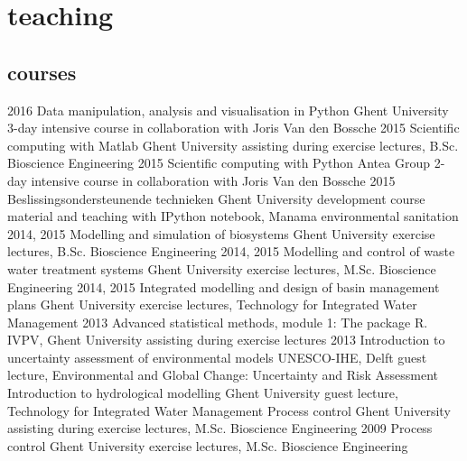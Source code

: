 \documentclass[]{stvhoey-cv}  %
\begin{document}
\section{teaching}
\subsection*{courses}
\begin{entrylist}
  \entry
    {2016}
    {Data manipulation, analysis and visualisation in Python}
    {Ghent University}
    {3-day intensive course in collaboration with Joris Van den Bossche}
  \entry
    {2015}
    {Scientific computing with Matlab}
    {Ghent University}
    {assisting during exercise lectures, B.Sc. Bioscience Engineering}
  \entry
    {2015}
    {Scientific computing with Python}
    {Antea Group}
    {2-day intensive course in collaboration with Joris Van den Bossche}
  \entry
    {2015}
    {Beslissingsondersteunende technieken}
    {Ghent University}
    {development course material and teaching with IPython notebook, Manama environmental sanitation}
  \entry
    {2014, 2015}
    {Modelling and simulation of biosystems}
    {Ghent University}
    {exercise lectures, B.Sc. Bioscience Engineering}
   \entry
    {2014, 2015} %
    {Modelling and control of waste water treatment systems}
    {Ghent University}
    {exercise lectures, M.Sc. Bioscience Engineering}
   \entry
    {2014, 2015}%
    {Integrated modelling and design of basin management plans}
    {Ghent University}
    {exercise lectures, Technology for Integrated Water Management}
   \entry
    {2013}
    {Advanced statistical methods, module 1: The package R.}
    {IVPV, Ghent University}
    {assisting during exercise lectures}
   \entry
    {2013}
    {Introduction to uncertainty assessment of environmental models}
    {UNESCO-IHE, Delft}
    {guest lecture, Environmental and Global Change: Uncertainty and Risk Assessment}
   \entry
    {}
    {Introduction to hydrological modelling}
    {Ghent University}
    {guest lecture, Technology for Integrated Water Management}
   \entry
	{} %
    {Process control}
    {Ghent University}
    {assisting during exercise lectures, M.Sc. Bioscience Engineering}
   \entry
    {2009}
    {Process control}
    {Ghent University}
    {exercise lectures, M.Sc. Bioscience Engineering}
\end{entrylist}
\end{document}
